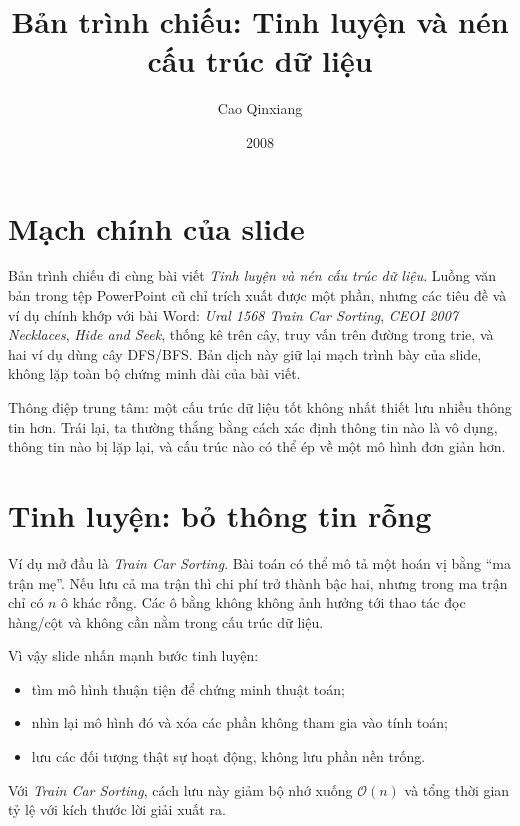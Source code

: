 \documentclass[11pt]{article}
\title{Bản trình chiếu: Tinh luyện và nén cấu trúc dữ liệu}
\author{Cao Qinxiang}
\date{2008}
\newcommand{\Oh}{\mathcal{O}}
\begin{document}
\maketitle


\section{Mạch chính của slide}

Bản trình chiếu đi cùng bài viết \emph{Tinh luyện và nén cấu trúc dữ liệu}.
Luồng văn bản trong tệp PowerPoint cũ chỉ trích xuất được một phần, nhưng các
tiêu đề và ví dụ chính khớp với bài Word: \textit{Ural 1568 Train Car
Sorting}, \textit{CEOI 2007 Necklaces}, \textit{Hide and Seek}, thống kê trên
cây, truy vấn trên đường trong trie, và hai ví dụ dùng cây DFS/BFS. Bản dịch
này giữ lại mạch trình bày của slide, không lặp toàn bộ chứng minh dài của bài
viết.

Thông điệp trung tâm: một cấu trúc dữ liệu tốt không nhất thiết lưu nhiều
thông tin hơn. Trái lại, ta thường thắng bằng cách xác định thông tin nào là
vô dụng, thông tin nào bị lặp lại, và cấu trúc nào có thể ép về một mô hình
đơn giản hơn.

\section{Tinh luyện: bỏ thông tin rỗng}

Ví dụ mở đầu là \textit{Train Car Sorting}. Bài toán có thể mô tả một hoán vị
bằng ``ma trận mẹ''. Nếu lưu cả ma trận thì chi phí trở thành bậc hai, nhưng
trong ma trận chỉ có \(n\) ô khác rỗng. Các ô bằng không không ảnh hưởng tới
thao tác đọc hàng/cột và không cần nằm trong cấu trúc dữ liệu.

Vì vậy slide nhấn mạnh bước tinh luyện:
\begin{itemize}
  \item tìm mô hình thuận tiện để chứng minh thuật toán;
  \item nhìn lại mô hình đó và xóa các phần không tham gia vào tính toán;
  \item lưu các đối tượng thật sự hoạt động, không lưu phần nền trống.
\end{itemize}
Với \textit{Train Car Sorting}, cách lưu này giảm bộ nhớ xuống \(\Oh(n)\) và
tổng thời gian tỷ lệ với kích thước lời giải xuất ra.
\end{document}
